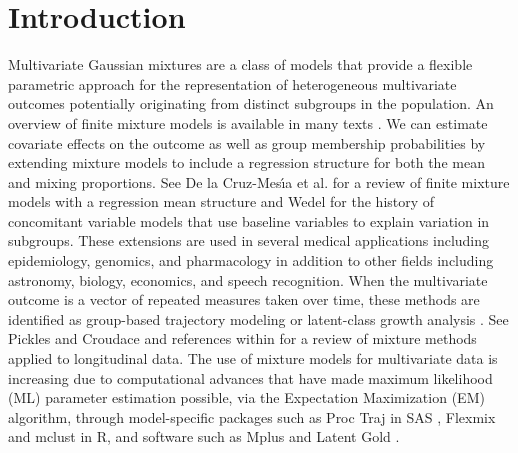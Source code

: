 \documentclass[10pt]{article}
\begin{document}
 
  \section{Introduction}
\noindent Multivariate Gaussian mixtures are a class of models that provide a flexible parametric approach for the representation of heterogeneous multivariate outcomes potentially originating from distinct subgroups in the population. An overview of finite mixture models is available in many texts \cite{everitt1981,titterington1985,mclachlan1988,mclachlan2000,fruhwirth2006}. We can estimate covariate effects on the outcome as well as group membership probabilities by extending mixture models to include a regression structure for both the mean and mixing proportions. See De la Cruz-Mes\'{\i}a et al. \cite{cruzmesia2008} for a review of finite mixture models with a regression mean structure and Wedel \cite{wedel2002} for the history of concomitant variable models that use baseline variables to explain variation in subgroups. These extensions are used in several medical applications  \cite{pranab2011} including epidemiology, genomics, and pharmacology in addition to other fields including astronomy, biology, economics, and speech recognition. When the multivariate outcome is a vector of repeated measures taken over time, these methods are identified as group-based trajectory modeling \cite{nagin1999,nagin2005} or latent-class growth analysis \cite{muthen2000, muthen2001}. See Pickles and Croudace \cite{pickles2010} and references within for a review of mixture methods applied to longitudinal data. The use of mixture models for multivariate data is increasing due to computational advances that have made maximum likelihood (ML) parameter estimation possible, via the Expectation Maximization (EM) algorithm, through model-specific packages such as Proc Traj in SAS \cite{jones2001}, Flexmix  \cite{leisch2004} and mclust \cite{fraley1999} in R, and software such as Mplus \cite{muthen2010} and Latent Gold \cite{vermunt2005}.\\\\
\end{document}
